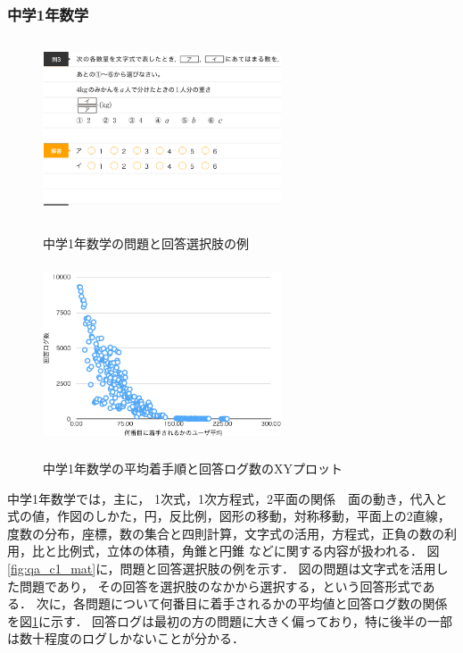 \subsubsection{中学1年数学}
\begin{figure}[ht]
\begin{center}
	\includegraphics[width=200pt, height=150pt]{./img/qa_c1_mat.png}
	\caption{中学1年数学の問題と回答選択肢の例}
	\label{fig:qa_c1_mat}
\endminipage\hfill
{}
	\includegraphics[width=200pt, height=150pt]{./img/stats_c1_mat.pdf}
	\caption{中学1年数学の平均着手順と回答ログ数のXYプロット}
	\label{fig:stats_c1_mat}
\endminipage\hfill
\end{center}
\end{figure}
中学1年数学では，主に，
1次式，1次方程式，2平面の関係　面の動き，代入と式の値，作図のしかた，円，反比例，図形の移動，対称移動，平面上の2直線，度数の分布，座標，数の集合と四則計算，文字式の活用，方程式，正負の数の利用，比と比例式，立体の体積，角錐と円錐
などに関する内容が扱われる．
図\ref{fig:qa_c1_mat}に，問題と回答選択肢の例を示す．
図の問題は文字式を活用した問題であり，
その回答を選択肢のなかから選択する，という回答形式である．
次に，各問題について何番目に着手されるかの平均値と回答ログ数の関係を図\ref{fig:stats_c1_mat}に示す．
回答ログは最初の方の問題に大きく偏っており，特に後半の一部は数十程度のログしかないことが分かる．


